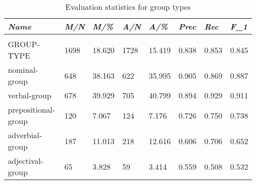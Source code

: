 \begin{table}[H]
    \centering
    \begin{tabulary}{\linewidth}{|L|l|l|l|l|l|l|l|}
        \hline
        \textit{Name}       & \textit{M/N} & \textit{M/\%} & \textit{A/N} & \textit{A/\%} & \textit{Prec} & \textit{Rec} & \textit{F_{1}} \\ \hline
        &              &              &              &              &               &              &             \\ \hline
        GROUP-TYPE          & 1698     & 18.620       & 1728     & 15.419       & 0.838         & 0.853        & 0.845       \\ \hline
        nominal-group       & 648      & 38.163       & 622      & 35.995       & 0.905         & 0.869        & 0.887       \\ \hline
        verbal-group        & 678      & 39.929       & 705      & 40.799       & 0.894         & 0.929        & 0.911       \\ \hline
        prepositional-group & 120      & 7.067        & 124      & 7.176        & 0.726         & 0.750        & 0.738       \\ \hline
        adverbial-group     & 187      & 11.013       & 218      & 12.616       & 0.606         & 0.706        & 0.652       \\ \hline
        adjectival-group    & 65       & 3.828        & 59       & 3.414        & 0.559         & 0.508        & 0.532       \\ \hline
    \end{tabulary}
    \caption{Evaluation statistics for group types}
    \label{tab:group-type-statistics}
\end{table}


